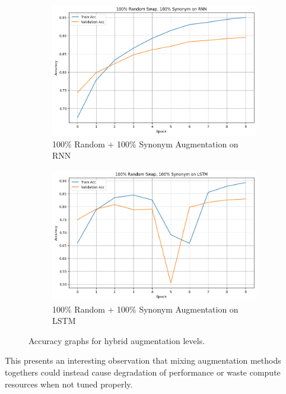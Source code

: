 \documentclass{article}
\begin{document}
\begin{figure}[H]
  \centering
  \begin{subfigure}[b]{0.45\textwidth}
    \includegraphics[width=\textwidth]{img/random_100_synonym_100_rnn.png}
    \caption{100\% Random + 100\% Synonym Augmentation on RNN}
    \label{fig:random_100_synonym_100_rnn}
  \end{subfigure}
  \hfill
  \begin{subfigure}[b]{0.45\textwidth}
    \includegraphics[width=\textwidth]{img/random_100_synonym_100_lstm.png}
    \caption{100\% Random + 100\% Synonym Augmentation on LSTM}
    \label{fig:random_100_synonym_100_lstm}
  \end{subfigure}
  \caption{Accuracy graphs for hybrid augmentation levels.}
  \label{fig:hybrid_extreme_substitution_acc_100100}
\end{figure}

This presents an interesting observation that mixing augmentation methods
togethers could instead cause degradation of performance or waste compute
resources when not tuned properly.
\end{document}
